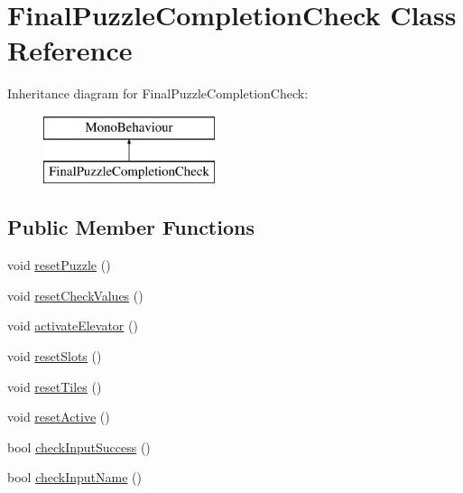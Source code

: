 \hypertarget{class_final_puzzle_completion_check}{}\section{Final\+Puzzle\+Completion\+Check Class Reference}
\label{class_final_puzzle_completion_check}
Inheritance diagram for Final\+Puzzle\+Completion\+Check\+:\begin{figure}[H]
\begin{center}
\leavevmode
\includegraphics[height=2.000000cm]{class_final_puzzle_completion_check}
\end{center}
\end{figure}
\subsection*{Public Member Functions}
\begin{DoxyCompactItemize}
\item 
void \hyperlink{class_final_puzzle_completion_check_afa55397d4f336e82c9767986f9312860}{reset\+Puzzle} ()
\item 
void \hyperlink{class_final_puzzle_completion_check_a47383ae7a03f939730d8c5290e92c0cc}{reset\+Check\+Values} ()
\item 
void \hyperlink{class_final_puzzle_completion_check_a2cd4702593ffbf8357cc0eddf24f553e}{activate\+Elevator} ()
\item 
void \hyperlink{class_final_puzzle_completion_check_add677a80884393ac52213eeb22615f4b}{reset\+Slots} ()
\item 
void \hyperlink{class_final_puzzle_completion_check_ac703da00c5cf3cc8dfad601b1961a9a3}{reset\+Tiles} ()
\item 
void \hyperlink{class_final_puzzle_completion_check_a74ba145de0f91eec81cdf77c6a0ed104}{reset\+Active} ()
\item 
bool \hyperlink{class_final_puzzle_completion_check_afa978714de4b54e9af76c01419ed5909}{check\+Input\+Success} ()
\item 
bool \hyperlink{class_final_puzzle_completion_check_aadb51258547c069a6597074951578423}{check\+Input\+Name} ()
\end{DoxyCompactItemize}
